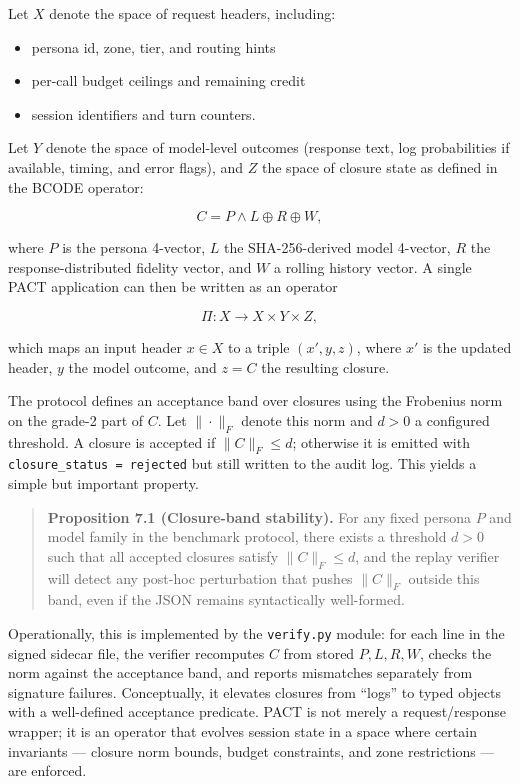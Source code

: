 \documentclass{article}
\providecommand{\tightlist}{\setlength{\itemsep}{0pt}\setlength{\parskip}{0pt}}
\begin{document}
Let \(X\) denote the space of request headers, including:

\begin{itemize}
\tightlist
\item
  persona id, zone, tier, and routing hints
\item
  per-call budget ceilings and remaining credit
\item
  session identifiers and turn counters.
\end{itemize}

Let \(Y\) denote the space of model-level outcomes (response text, log
probabilities if available, timing, and error flags), and \(Z\) the
space of closure state as defined in the BCODE operator:

\[
C = P \wedge L \oplus R \oplus W,
\]

where \(P\) is the persona 4-vector, \(L\) the SHA-256-derived model
4-vector, \(R\) the response-distributed fidelity vector, and \(W\) a
rolling history vector. A single PACT application can then be written as
an operator

\[
\Pi : X \to X \times Y \times Z,
\]

which maps an input header \(x \in X\) to a triple \((x', y, z)\), where
\(x'\) is the updated header, \(y\) the model outcome, and \(z = C\) the
resulting closure.

The protocol defines an acceptance band over closures using the
Frobenius norm on the grade-2 part of \(C\). Let \(\|\cdot\|_F\) denote
this norm and \(d > 0\) a configured threshold. A closure is accepted if
\(\|C\|_F \le d\); otherwise it is emitted with
\texttt{closure\_status\ =\ rejected} but still written to the audit
log. This yields a simple but important property.

\begin{quote}
\textbf{Proposition 7.1 (Closure-band stability).} For any fixed persona
\(P\) and model family in the benchmark protocol, there exists a
threshold \(d > 0\) such that all accepted closures satisfy
\(\|C\|_F \le d\), and the replay verifier will detect any post-hoc
perturbation that pushes \(\|C\|_F\) outside this band, even if the JSON
remains syntactically well-formed.
\end{quote}

Operationally, this is implemented by the \texttt{verify.py} module: for
each line in the signed sidecar file, the verifier recomputes \(C\) from
stored \(P, L, R, W\), checks the norm against the acceptance band, and
reports mismatches separately from signature failures. Conceptually, it
elevates closures from ``logs'' to typed objects with a well-defined
acceptance predicate. PACT is not merely a request/response wrapper; it
is an operator that evolves session state in a space where certain
invariants --- closure norm bounds, budget constraints, and zone
restrictions --- are enforced.
\end{document}
